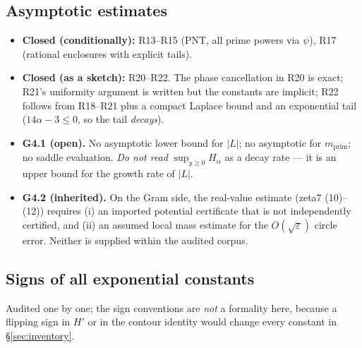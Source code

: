 \documentclass[11pt]{article}
\begin{document}
\subsection{Asymptotic estimates}
\begin{itemize}[leftmargin=1.4em]
\item \textbf{Closed (conditionally):} R13--R15 (PNT, all prime powers via $\psi$), R17 (rational
      enclosures with explicit tails).
\item \textbf{Closed (as a sketch):} R20--R22. The phase cancellation in R20 is exact; R21's uniformity
      argument is written but the constants are implicit; R22 follows from R18--R21 plus a compact
      Laplace bound and an exponential tail ($14\alpha-3\le0$, so the tail \emph{decays}).
\item \textbf{G4.1 (open).} No asymptotic lower bound for $|L|$; no asymptotic for
      $m_{\mathrm{prim}}$; no saddle evaluation. \emph{Do not read} $\sup_{y\ge0}H_\alpha$ as a decay
      rate --- it is an upper bound for the growth rate of $|L|$.
\item \textbf{G4.2 (inherited).} On the Gram side, the real-value estimate (zeta7 (10)--(12)) requires
      (i) an imported potential certificate that is not independently certified, and (ii) an assumed
      local mass estimate for the $O(\sqrt\varepsilon)$ circle error. Neither is supplied within the
      audited corpus.
\end{itemize}

\subsection{Signs of all exponential constants}
Audited one by one; the sign conventions are \emph{not} a formality here, because a flipping sign in
$H'$ or in the contour identity would change every constant in \S\ref{sec:inventory}.
\end{document}
